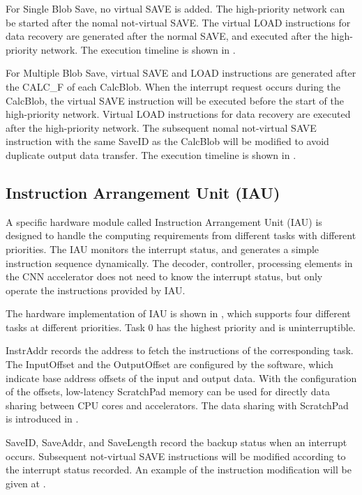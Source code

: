 For Single Blob Save, no virtual SAVE is added. The high-priority network can be started after the nomal not-virtual SAVE. The virtual LOAD instructions for data recovery are generated after the normal SAVE, and executed after the high-priority network. The execution timeline is shown in .

For Multiple Blob Save, virtual SAVE and LOAD instructions are generated after the CALC\_F of each CalcBlob. When the interrupt request occurs during the CalcBlob, the virtual SAVE instruction will be executed before the start of the high-priority network. Virtual LOAD instructions for data recovery are executed after the high-priority network. The subsequent nomal not-virtual SAVE instruction with the same SaveID as the CalcBlob will be modified to avoid duplicate output data transfer. The execution timeline is shown in .








\subsection{ Instruction Arrangement Unit (IAU) }

A specific hardware module called Instruction Arrangement Unit (IAU) is designed to handle the computing requirements from different tasks with different priorities. The IAU monitors the interrupt status, and generates a simple instruction sequence dynamically. The decoder, controller, processing elements in the CNN accelerator does not need to know the interrupt status, but only operate the instructions provided by IAU.

The hardware implementation of IAU is shown in , which supports four different tasks at different priorities. Task 0 has the highest priority and is uninterruptible. 

InstrAddr records the address to fetch the instructions of the corresponding task. The InputOffset and the OutputOffset are configured by the software, which indicate base address offsets of the input and output data. With the configuration of the offsets, low-latency ScratchPad memory \cite{Banakar2002Scratchpad} can be used for directly data sharing between CPU cores and accelerators. The data sharing with ScratchPad \cite{Banakar2002Scratchpad} is introduced in .


SaveID, SaveAddr, and SaveLength record the backup status when an interrupt occurs. 
Subsequent not-virtual SAVE instructions will be modified according to the interrupt status recorded.
An example of the instruction modification will be given at .


